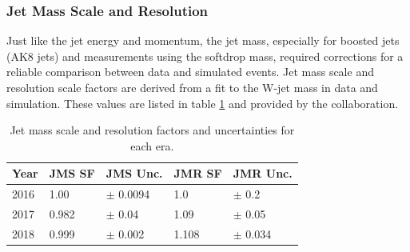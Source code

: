 \subsubsection{Jet Mass Scale and Resolution}\label{JMS} Just like the jet energy and momentum, the jet mass, especially for boosted jets (AK8 jets) and measurements using the softdrop mass, required corrections for a reliable comparison between data and simulated events. Jet mass scale and resolution scale factors are derived from a fit to the W-jet mass in data and simulation. These values are listed in table \ref{table:JMS} and provided by the collaboration.
\begin{table}[h!]
  \centering
\begin{tabular}{lllll}
\hline
\textbf{Year} & \textbf{JMS SF} & \textbf{JMS Unc.}         & \textbf{JMR SF} & \textbf{JMR Unc.}        \\ \hline
2016          & 1.00            &$\pm$ 0.0094 & 1.0             & $\pm$ 0.2   \\
2017          & 0.982           & $\pm$ 0.04   & 1.09            & $\pm$ 0.05  \\
2018          & 0.999           & $\pm$ 0.002  & 1.108           & $\pm$ 0.034 \\ \hline
\end{tabular}
  \caption{Jet mass scale and resolution factors and uncertainties for each era.}
  \label{table:JMS}
\end{table}
